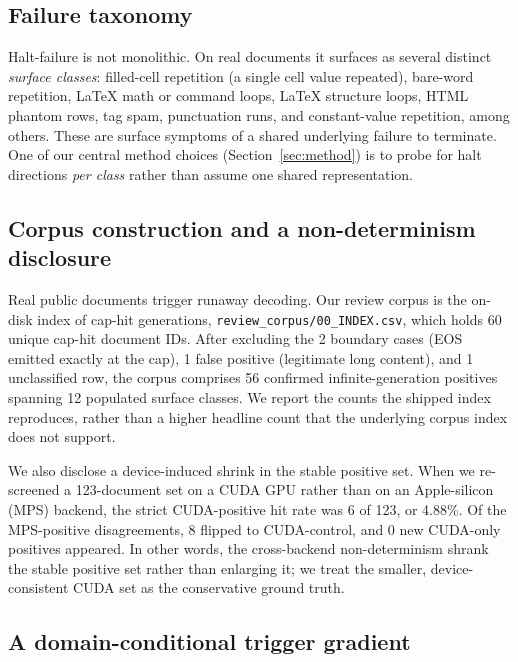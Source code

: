 \documentclass[11pt]{article}
\begin{document}
\subsection{Failure taxonomy}

Halt-failure is not monolithic. On real documents it surfaces as several distinct
\emph{surface classes}: filled-cell repetition (a single cell value repeated),
bare-word repetition, LaTeX math or command loops, LaTeX structure loops, HTML phantom
rows, tag spam, punctuation runs, and constant-value repetition, among others. These
are surface symptoms of a shared underlying failure to terminate. One of our central
method choices (Section~\ref{sec:method}) is to probe for halt directions \emph{per
class} rather than assume one shared representation.

\subsection{Corpus construction and a non-determinism disclosure}

Real public documents trigger runaway decoding. Our review corpus is the on-disk
index of cap-hit generations, \texttt{review\_corpus/00\_INDEX.csv}, which holds 60
unique cap-hit document IDs. After excluding the 2 boundary cases (EOS emitted exactly
at the cap), 1 false positive (legitimate long content), and 1 unclassified row, the
corpus comprises 56 confirmed infinite-generation positives spanning 12 populated
surface classes. We report the counts the shipped index reproduces, rather than a
higher headline count that the underlying corpus index does not support.

We also disclose a device-induced shrink in the stable positive set. When we
re-screened a 123-document set on a CUDA GPU rather than on an Apple-silicon (MPS)
backend, the strict CUDA-positive hit rate was 6 of 123, or 4.88\%. Of the
MPS-positive disagreements, 8 flipped to CUDA-control, and 0 new CUDA-only positives
appeared. In other words, the cross-backend non-determinism shrank the stable positive
set rather than enlarging it; we treat the smaller, device-consistent CUDA set as the
conservative ground truth.

\subsection{A domain-conditional trigger gradient}
\end{document}

